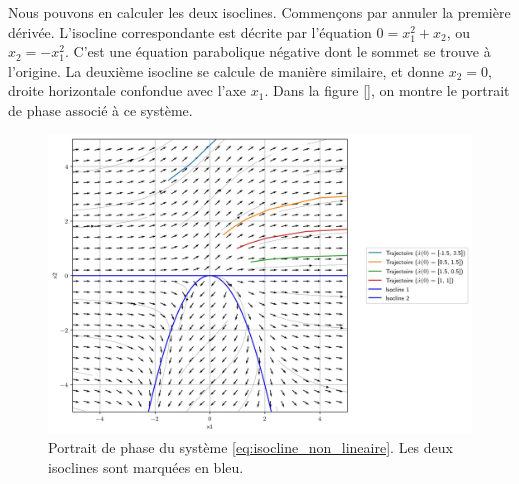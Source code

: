            Nous pouvons en calculer les deux isoclines. Commençons par annuler la première dérivée. L'isocline correspondante est décrite par l'équation $0 = x_1^2 + x_2$, ou $x_2 = -x_1^2$. C'est une équation parabolique négative dont le sommet se trouve à l'origine. La deuxième isocline se calcule de manière similaire, et donne $x_2 = 0$, droite horizontale confondue avec l'axe $x_1$. Dans la figure \ref{}, on montre le portrait de phase associé à ce système.
            \begin{figure}[ht!]
                \centering
                \includegraphics[width=\textwidth]{images/exemple_non_lineaire_1.jpg}
                \caption{Portrait de phase du système \ref{eq:isocline_non_lineaire}. Les deux isoclines sont marquées en bleu.}
                \label{fig:exemple_non_lineaire_1}
            \end{figure}

